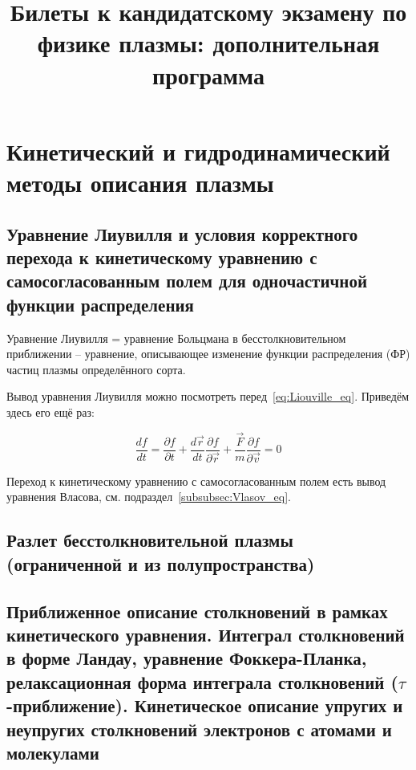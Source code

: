 \documentclass[10pt, a4paper]{article}
\let\stdsection\section
\renewcommand\section{\newpage\stdsection}
\begin{document}
\title{Билеты к кандидатскому экзамену по физике плазмы: дополнительная программа}
\setcounter{section}{0}

\maketitle

\section{Кинетический и гидродинамический методы описания плазмы}

\subsection{Уравнение Лиувилля и условия корректного перехода к кинетическому уравнению с самосогласованным полем для одночастичной функции распределения}

Уравнение Лиувилля = уравнение Больцмана в бесстолкновительном приближении -- уравнение, описывающее изменение функции распределения (ФР) частиц плазмы определённого сорта.

Вывод уравнения Лиувилля можно посмотреть перед~\ref{eq:Liouville_eq}. Приведём здесь его ещё раз:

\begin{equation}
	\frac{df}{dt} = \frac{\partial f}{\partial t} + \frac{d\vec{r}}{dt}\frac{\partial f}{\partial \vec{r}}+ \frac{\vec{F}}{m}\frac{\partial f}{\partial \vec{v}} = 0
\end{equation}

Переход к кинетическому уравнению с самосогласованным полем есть вывод уравнения Власова, см. подраздел~\ref{subsubsec:Vlasov_eq}.

\subsection{Разлет бесстолкновительной плазмы (ограниченной и из полупространства)}

\subsection[Приближенное описание столкновений в рамках кинетического уравнения. Интеграл столкновений в форме Ландау, уравнение Фоккера-Планка, релаксационная форма интеграла 	столкновений ($\tau$-приближение). Кинетическое описание упругих и неупругих столкновений электронов с атомами и молекулами. Приближенное описание кинетики электронов в слабом однородном электрическом поле (расчет эффективной частоты столкновений и нагрева электронов). Явление убегающих электронов]{Приближенное описание столкновений в рамках кинетического уравнения. Интеграл столкновений в форме Ландау, уравнение Фоккера-Планка, релаксационная форма интеграла 	столкновений \linebreak ($\tau$-приближение). Кинетическое описание упругих и неупругих столкновений электронов с атомами и молекулами} \label{subsec:collision_terms}
\end{document}
